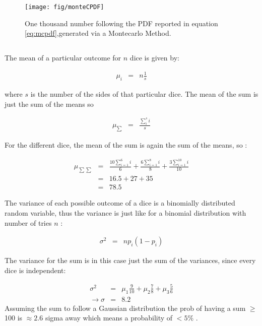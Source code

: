 \documentclass[twocolumn]{article}
\begin{document}
	\begin{figure}[h!]
		\begin{center}
			\texttt{[image: fig/monteCPDF]}
		\end{center}
		\caption{One thousand number following the PDF reported in equation \ref{eq:mcpdf},generated via a Montecarlo Method.}
		\label{fig:figure1}
	\end{figure}


\subsection{}

	The mean of a particular outcome for $n$ dice is given by: 

	\begin{eqnarray}
	\mu_{i} &=& n \frac{1}{s}
	\end{eqnarray}

	where $ s $ is the number of the sides of that particular dice. The mean of the sum is just the sum of the means so 

	\begin{eqnarray}
	\mu_{\sum} &=& \frac{\sum\limits_{i}^{s}i}{s}
	\end{eqnarray}

	For the different dice, the mean of the sum is again the sum of the means, so : 


	\begin{eqnarray}
	\mu_{\sum\sum} &=& \frac{10\sum\limits_{i=1}^{6}i}{6} +\frac{6\sum\limits_{i=1}^{8}i}{8}+\frac{3\sum\limits_{i=1}^{10}i}{10}\\
	&=& 16.5+27+35\\
	&=& 78.5
	\end{eqnarray}


	The variance of each possible outcome of a dice is a binomially distributed random variable, thus the variance is just like for a binomial distribution with number of tries $n$ : 

	\begin{eqnarray}
	\sigma^{2}&=& n p_{i}(1-p_{i})
	\end{eqnarray}

	The variance for the sum is in this case just the sum of the variances, since every dice is independent: 

	\begin{eqnarray}
	\sigma^{2} &=& \mu_{1}\frac{9}{10} + \mu_{2}\frac{7}{8} + \mu_{3}\frac{5}{6}\\
	\rightarrow \sigma &=& 8.2 
	\end{eqnarray}
    Assuming the sum to follow a Gaussian distribution  the prob of having a sum $\ge$ 100 is $\approx 2.6$ sigma away which means a probability of $< 5\%$ .
\end{document}

